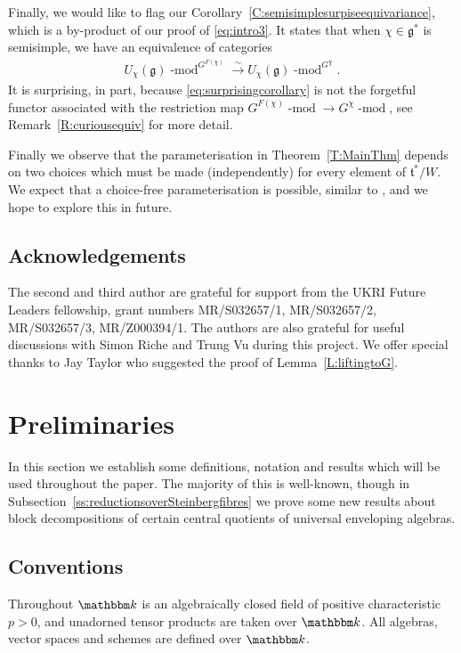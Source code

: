 \documentclass[twoside,12pt,reqno]{amsart}
\theoremstyle{remark}
\numberwithin{equation}{section}
\def\isoto{\overset{\sim}{\longrightarrow}}
\def\k{{\mathbbm k}}
\def\lmod{\!\operatorname{-mod}}
\def\g{{\mathfrak g}}
\def\t{\mathfrak t}
\begin{document}
Finally, we would like to flag our Corollary~\ref{C:semisimplesurpiseequivariance}, which is a by-product of our proof of \eqref{eq:intro3}. It states that when $\chi \in \g^*$ is semisimple, we have an equivalence of categories
\begin{eqnarray}\label{eq:surprisingcorollary}
    U_\chi(\g)\lmod^{G^{F(\chi)}} \isoto U_\chi(\g)\lmod^{G^\chi}.
\end{eqnarray}
It is surprising, in part, because \eqref{eq:surprisingcorollary} is not the forgetful functor associated with the restriction map $G^{F(\chi)}\lmod \to G^\chi\lmod$, see Remark~\ref{R:curiousequiv} for more detail.

Finally we observe that the parameterisation in Theorem~\ref{T:MainThm} depends on two choices which must be made (independently) for every element of $\t^*/W$. We expect that a choice-free parameterisation is possible, similar to \cite{BG}, and we hope to explore this in future.


 
    

\subsection*{Acknowledgements}
The second and third author are grateful for support from the UKRI Future Leaders fellowship, grant numbers MR/S032657/1, MR/S032657/2, MR/S032657/3, MR/Z000394/1. The authors are also grateful for useful discussions with Simon Riche and Trung Vu during this project. We offer special thanks to Jay Taylor who suggested the proof of Lemma~\ref{L:liftingtoG}.

\tableofcontents


\section{Preliminaries}

In this section we establish some definitions, notation and results which will be used throughout the paper. The majority of this is well-known, though in Subsection~\ref{ss:reductionsoverSteinbergfibres} we prove some new results about block decompositions of certain central quotients of universal enveloping algebras.

\subsection{Conventions}

Throughout $\k$ is an algebraically closed field of positive characteristic $p > 0$, and unadorned tensor products are taken over $\k$. All algebras, vector spaces and schemes are defined over $\k$.
\end{document}
